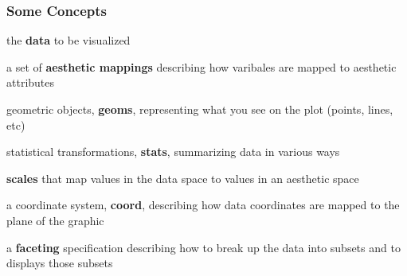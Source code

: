 \documentclass[12pt]{beamer}\usepackage[]{graphicx}\usepackage[]{color}
\begin{document}

\begin{frame}
\frametitle{Some Concepts}

\bi
  \item the \textbf{data} to be visualized
  \item a set of \textbf{aesthetic mappings} describing how varibales are mapped to aesthetic attributes
  \item geometric objects, \textbf{geoms}, representing what you  see on the plot (points, lines, etc)
  \item statistical transformations, \textbf{stats}, summarizing data in various ways
  \item \textbf{scales} that map values in the data space to values in an aesthetic space
  \item a coordinate system, \textbf{coord}, describing how data coordinates are mapped to the plane of the graphic
  \item a \textbf{faceting} specification describing how to break up the data into subsets and to displays those subsets
\ei

\end{frame}
\end{document}
